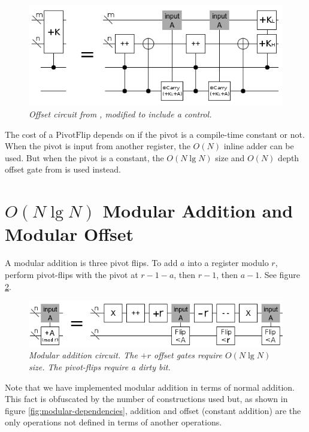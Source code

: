 \documentclass[twocolumn]{article}
\begin{document}
\begin{figure}
  \centering
  \includegraphics[totalheight=3.1cm]{controlled-offset.png}
  \caption{\em Offset circuit from \cite{haner2016}, modified to include a control.}
  \label{fig:controlled-offset}
\end{figure}

The cost of a $\text{PivotFlip}$ depends on if the pivot is a compile-time constant or not.
When the pivot is input from another register, the $O(N)$ inline adder can be used.
But when the pivot is a constant, the $O(N \lg N)$ size and $O(N)$ depth offset gate from \cite{haner2016} is used instead.

\section{$O(N \lg N)$ Modular Addition and Modular Offset} \label{sec:last-circuit}

A modular addition is three pivot flips.
To add $a$ into a register modulo $r$, perform pivot-flips with the pivot at $r-1-a$, then $r-1$, then $a-1$.
See figure \ref{fig:modular-add}.

\begin{figure}
  \centering
  \includegraphics[totalheight=1.4cm]{modular-addition.png}
  \caption{\em Modular addition circuit.
  The $+r$ offset gates require $O(N \lg N)$ size.
  The pivot-flips require a dirty bit.}
  \label{fig:modular-add}
\end{figure}

Note that we have implemented modular addition in terms of normal addition.
This fact is obfuscated by the number of constructions used but, as shown in figure \ref{fig:modular-dependencies}, addition and offset (constant addition) are the only operations not defined in terms of another operations.
\end{document}
